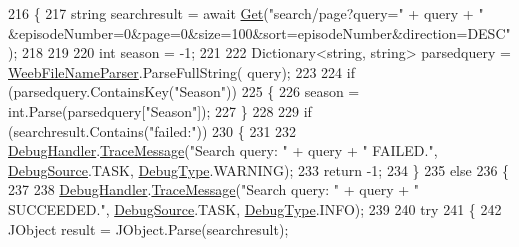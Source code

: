 \begin{DoxyCode}
216         \{
217             \textcolor{keywordtype}{string} searchresult = await \mbox{\hyperlink{class_little_weeb_library_1_1_handlers_1_1_nibl_handler_a2989b180582fadd05111d010c0700411}{Get}}(\textcolor{stringliteral}{"search/page?query="} + query + \textcolor{stringliteral}{"
      &episodeNumber=0&page=0&size=100&sort=episodeNumber&direction=DESC"});
218 
219 
220             \textcolor{keywordtype}{int} season = -1;
221 
222             Dictionary<string, string> parsedquery = \mbox{\hyperlink{class_little_weeb_library_1_1_handlers_1_1_nibl_handler_a0aae159f51f737bbb89946b8fe8c8743}{WeebFileNameParser}}.ParseFullString(
      query);
223 
224             \textcolor{keywordflow}{if} (parsedquery.ContainsKey(\textcolor{stringliteral}{"Season"}))
225             \{
226                 season = \textcolor{keywordtype}{int}.Parse(parsedquery[\textcolor{stringliteral}{"Season"}]);
227             \}
228 
229             \textcolor{keywordflow}{if} (searchresult.Contains(\textcolor{stringliteral}{"failed:"}))
230             \{
231 
232                 \mbox{\hyperlink{class_little_weeb_library_1_1_handlers_1_1_nibl_handler_a334c2111588fa71d1203bd8cbb572970}{DebugHandler}}.\mbox{\hyperlink{interface_little_weeb_library_1_1_handlers_1_1_i_debug_handler_a2e405bc3492e683cd3702fae125221bc}{TraceMessage}}(\textcolor{stringliteral}{"Search query: "} + query + \textcolor{stringliteral}{" FAILED."}, 
      \mbox{\hyperlink{namespace_little_weeb_library_1_1_handlers_a2a6ca0775121c9c503d58aa254d292be}{DebugSource}}.TASK, \mbox{\hyperlink{namespace_little_weeb_library_1_1_handlers_ab66019ed40462876ec4e61bb3ccb0a62}{DebugType}}.WARNING);
233                 \textcolor{keywordflow}{return} -1;
234             \}
235             \textcolor{keywordflow}{else}
236             \{
237 
238                 \mbox{\hyperlink{class_little_weeb_library_1_1_handlers_1_1_nibl_handler_a334c2111588fa71d1203bd8cbb572970}{DebugHandler}}.\mbox{\hyperlink{interface_little_weeb_library_1_1_handlers_1_1_i_debug_handler_a2e405bc3492e683cd3702fae125221bc}{TraceMessage}}(\textcolor{stringliteral}{"Search query: "} + query + \textcolor{stringliteral}{" SUCCEEDED."},
       \mbox{\hyperlink{namespace_little_weeb_library_1_1_handlers_a2a6ca0775121c9c503d58aa254d292be}{DebugSource}}.TASK, \mbox{\hyperlink{namespace_little_weeb_library_1_1_handlers_ab66019ed40462876ec4e61bb3ccb0a62}{DebugType}}.INFO);
239 
240                 \textcolor{keywordflow}{try}
241                 \{
242                     JObject result = JObject.Parse(searchresult);

\end{DoxyCode}
